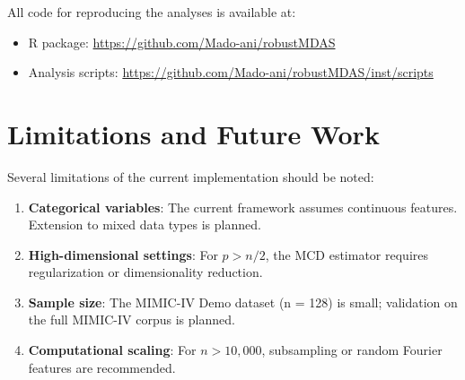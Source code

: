 \documentclass[10pt,a4paper]{article}
\begin{document}
All code for reproducing the analyses is available at:

\begin{itemize}
    \item R package: \url{https://github.com/Mado-ani/robustMDAS}
    \item Analysis scripts: \url{https://github.com/Mado-ani/robustMDAS/inst/scripts}
\end{itemize}

\section{Limitations and Future Work}

Several limitations of the current implementation should be noted:

\begin{enumerate}
    \item \textbf{Categorical variables}: The current framework assumes continuous features. Extension to mixed data types is planned.
    
    \item \textbf{High-dimensional settings}: For $p > n/2$, the MCD estimator requires regularization or dimensionality reduction.
    
    \item \textbf{Sample size}: The MIMIC-IV Demo dataset (n = 128) is small; validation on the full MIMIC-IV corpus is planned.
    
    \item \textbf{Computational scaling}: For $n > 10,000$, subsampling or random Fourier features are recommended.
\end{enumerate}
\end{document}
